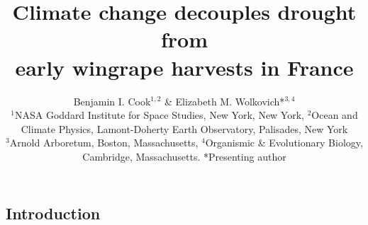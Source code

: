 \documentclass[portrait,a0,final] {a0poster} %
\title{Climate change decouples drought from \\early wingrape harvests in France}
\author{Benjamin I. Cook\(^{1,2}\) \& Elizabeth M. Wolkovich*\(^{3, 4}\) \\ $^{1}$NASA Goddard Institute for Space Studies, New York, New York, $^{2}$Ocean and Climate Physics, Lamont-Doherty Earth Observatory, Palisades, New York\\$^{3}$Arnold Arboretum, Boston, Massachusetts, $^{4}$Organismic \& Evolutionary Biology, Cambridge, Massachusetts. *Presenting author}
\begin{document}
\hspace{-3cm}								%
\colorbox{boxcol}{							%
\begin{minipage}{841mm}					%
\begin{center}
\maketitle
\end{center}
\end{minipage}}
\vspace{1cm}

\begin{multicols}{2}							%
\raggedcolumns


\section*{Introduction}


\end{multicols}
\end{document}
